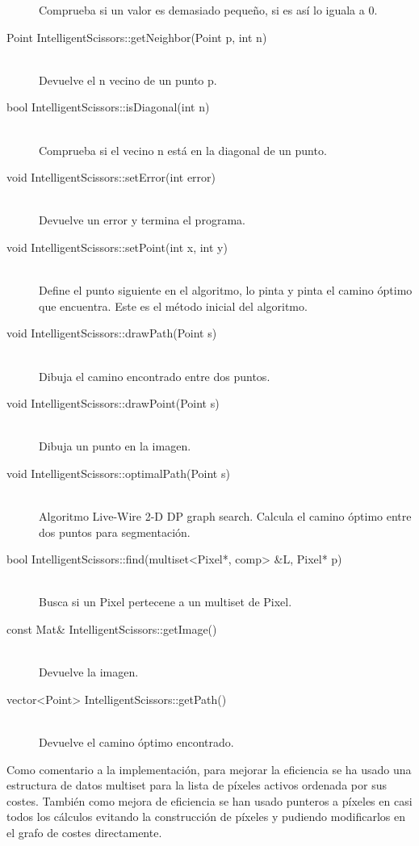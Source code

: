 \begin{description}
	Comprueba si un valor es demasiado pequeño, si es así lo iguala a 0.
\item[Point IntelligentScissors::getNeighbor(Point p, int n)]\hfill \\
	Devuelve el n vecino de un punto p.
\item[bool IntelligentScissors::isDiagonal(int n)]\hfill \\
	Comprueba si el vecino n está en la diagonal de un punto.
\item[void IntelligentScissors::setError(int error)]\hfill \\
	Devuelve un error y termina el programa.
\item[void IntelligentScissors::setPoint(int x, int y)]\hfill \\
	Define el punto siguiente en el algoritmo, lo pinta y pinta el camino óptimo que encuentra. Este es el método inicial del algoritmo.
\item[void IntelligentScissors::drawPath(Point s)]\hfill \\
	Dibuja el camino encontrado entre dos puntos.
\item[void IntelligentScissors::drawPoint(Point s)]\hfill \\
	Dibuja un punto en la imagen.
\item[void IntelligentScissors::optimalPath(Point s)]\hfill \\
	Algoritmo Live-Wire 2-D DP graph search. Calcula el camino óptimo entre dos puntos para segmentación.
\item[bool IntelligentScissors::find(multiset<Pixel*, comp> &L, Pixel* p)]\hfill \\
	Busca si un Pixel pertecene a un multiset de Pixel.
\item[const Mat& IntelligentScissors::getImage()]\hfill \\
	Devuelve la imagen.
\item[vector<Point> IntelligentScissors::getPath()]\hfill \\
	Devuelve el camino óptimo encontrado.
	
	\end{description}

Como comentario a la implementación, para mejorar la eficiencia se ha usado una estructura de datos multiset para la lista de píxeles activos ordenada por sus costes. También como mejora de eficiencia se han usado punteros a píxeles en casi todos los cálculos evitando la construcción de píxeles y pudiendo modificarlos en el grafo de costes directamente. \\

